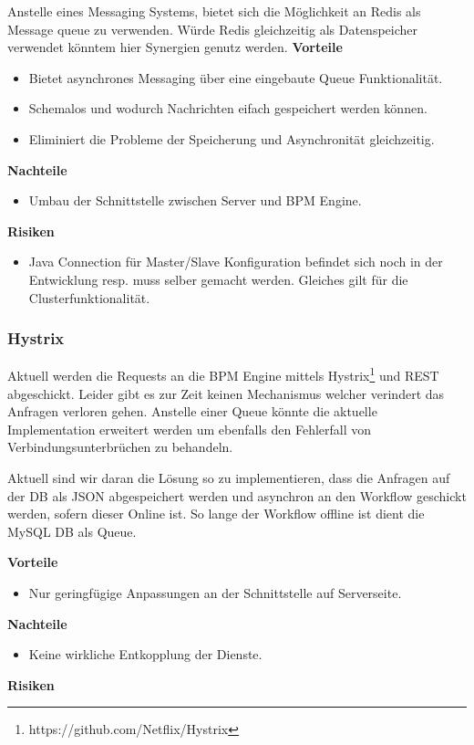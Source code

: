 Anstelle eines Messaging Systems, bietet sich die Möglichkeit an Redis als Message queue zu verwenden. Würde Redis gleichzeitig als Datenspeicher verwendet könntem hier Synergien genutz werden.
\newline
\newline
\textbf{Vorteile}
\begin{itemize}
	\item Bietet asynchrones Messaging über eine eingebaute Queue Funktionalität.
	\item Schemalos und wodurch Nachrichten eifach gespeichert werden können.
	\item Eliminiert die Probleme der Speicherung und Asynchronität gleichzeitig.
\end{itemize}
\textbf{Nachteile}
\begin{itemize}
	\item Umbau der Schnittstelle zwischen Server und BPM Engine.
\end{itemize}
\textbf{Risiken}
\begin{itemize}
	\item Java Connection für Master/Slave Konfiguration befindet sich noch in der Entwicklung resp. muss selber gemacht werden. Gleiches gilt für die Clusterfunktionalität.
\end{itemize}

\subsubsection{Hystrix}

Aktuell werden die Requests an die BPM Engine mittels Hystrix\footnote{https://github.com/Netflix/Hystrix} und REST abgeschickt. Leider gibt es zur Zeit keinen Mechanismus welcher verindert das Anfragen verloren gehen. Anstelle einer Queue könnte die aktuelle Implementation erweitert werden um ebenfalls den Fehlerfall von Verbindungsunterbrüchen zu behandeln.

Aktuell sind wir daran die Lösung so zu implementieren, dass die Anfragen auf der DB als JSON abgespeichert werden und asynchron an den Workflow geschickt werden, sofern dieser Online ist. So lange der Workflow offline ist dient die MySQL DB als Queue.

\newline
\newline
\textbf{Vorteile}
\begin{itemize}
	\item Nur geringfügige Anpassungen an der Schnittstelle auf Serverseite.
\end{itemize}
\textbf{Nachteile}
\begin{itemize}
	\item Keine wirkliche Entkopplung der Dienste.
\end{itemize}
\textbf{Risiken}

